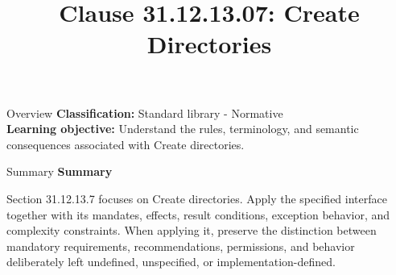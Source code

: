 \documentclass[10pt,letterpaper]{article}
\title{Clause 31.12.13.07: Create Directories}
\author{}
\date{}
\begin{document}
\maketitle
\begin{CornellOverviewBox}{Overview}
\textbf{Classification:} Standard library - Normative\\[2pt]
\textbf{Learning objective:} Understand the rules, terminology, and semantic consequences associated with Create directories.
\end{CornellOverviewBox}\begin{CornellSummaryBox}{Summary}
{\sffamily\bfseries\color{Accent} Summary}\par\vspace{3pt}Section 31.12.13.7 focuses on Create directories. Apply the specified interface together with its mandates, effects, result conditions, exception behavior, and complexity constraints. When applying it, preserve the distinction between mandatory requirements, recommendations, permissions, and behavior deliberately left undefined, unspecified, or implementation-defined.
\end{CornellSummaryBox}
\end{document}
